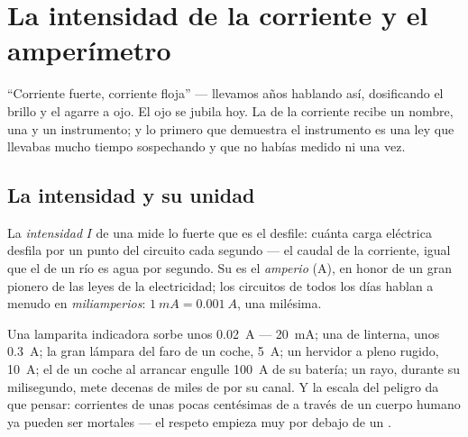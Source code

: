 \chapter{La intensidad de la corriente y el amperímetro}\label{ch:g8:intensity-ammeter}

``Corriente fuerte, corriente floja'' --- llevamos años hablando así,
dosificando el brillo y el agarre a ojo. El ojo se jubila hoy. La
 de la corriente recibe un nombre, una  y un
instrumento; y lo primero que demuestra el instrumento es una ley que
llevabas mucho tiempo sospechando y que no habías medido ni una vez.

\section{La intensidad y su unidad}

\begin{definition}[Intensidad]\label{def:g8:intensity-ammeter:intensity}
La \emph{intensidad} $I$ de una  mide lo fuerte que es el desfile: cuánta carga eléctrica
desfila por un punto del circuito cada segundo --- el caudal de la
corriente, igual que el de un río es agua por segundo. Su
 es el \emph{amperio} (\unit{A}), en honor de
un gran pionero de las leyes de la electricidad; los circuitos de todos
los días hablan a menudo en \emph{miliamperios}: $\qty{1}{mA} =
\qty{0.001}{A}$, una milésima.
\end{definition}

\begin{example}\label{ex:g8:intensity-ammeter:values}
Una lamparita indicadora sorbe unos \qty{0.02}{A} --- \qty{20}{mA};
una  de linterna, unos \qty{0.3}{A}; la gran lámpara del faro
de un coche, \qty{5}{A}; un hervidor a pleno rugido, \qty{10}{A}; el
 de un coche al arrancar engulle \qty{100}{A} de su
batería; un rayo, durante su milisegundo, mete decenas de miles de
 por su canal. Y la escala del peligro da que pensar:
corrientes de unas pocas centésimas de  a través de un
cuerpo humano ya pueden ser mortales --- el respeto empieza muy por
debajo de un .
\end{example}

